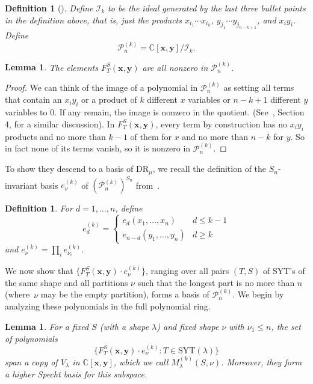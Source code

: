 \documentclass[11pt]{article}
\newtheorem{definition}[theo]{Definition}
\newtheorem{lemma}[theo]{Lemma}
\theoremstyle{definition}
\numberwithin{equation}{section}
\newcommand{\SYT}{\mathrm{SYT}}
\newcommand{\DR}{\mathrm{DR}}
\begin{document}
\begin{definition}[\cite{HookBases}]
	Define $\mathcal{I}_k$ to be the ideal generated by  the last three bullet points in the definition above, that is, just the products $x_{i_1}\cdots x_{i_k}$, $y_{j_1}\cdots y_{j_{n-k+1}}$, and $x_iy_i$.  Define $$\mathcal{P}_{n}^{(k)}=\mathbb{C}[\mathbf{x},\mathbf{y}]/\mathcal{I}_k.$$
\end{definition}

\begin{lemma}
	The elements $F_T^S(\mathbf{x},\mathbf{y})$ are all nonzero in $\mathcal{P}_n^{(k)}$.
\end{lemma}

\begin{proof}
	We can think of the image of a polynomial in $\mathcal{P}_n^{(k)}$ as setting all terms that contain an $x_iy_i$ or a product of $k$ different $x$ variables or $n-k+1$ different $y$ variables to $0$.  If any remain, the image is nonzero in the quotient. (See~\cite{HookBases}, Section 4, for a similar discussion).  In $F_T^S(\mathbf{x},\mathbf{y})$, every term by construction has no $x_iy_i$ products and no more than $k-1$ of them for $x$ and no more than $n-k$ for $y$.  So in fact none of its terms vanish, so it is nonzero in $\mathcal{P}_n^{(k)}$.
\end{proof}

To show they descend to a basis of $\DR_\mu$, we recall the definition of the $S_n$-invariant basis $e_\nu^{(k)}$ of $(\mathcal{P}_n^{(k)})^{S_n}$ from~\cite{HookBases}.

\begin{definition}
	For $d=1,\ldots,n$, define $$e_d^{(k)}=\begin{cases}
	e_d(x_1,\ldots,x_n) & d\le k-1 \\
	e_{n-d}(y_1,\ldots,y_n) & d\ge k
	\end{cases}$$ and $e_\nu^{(k)}=\prod_i e_{\nu_i}^{(k)}$.
\end{definition}

We now show that $\{F_T^S(\mathbf{x},\mathbf{y})\cdot e_\nu^{(k)}\}$, ranging over all pairs $(T,S)$ of SYT's of the same shape and all partitions $\nu$ such that the longest part is no more than $n$ (where~$\nu$ may be the empty partition), forms a basis of $\mathcal{P}_n^{(k)}$.  We begin by analyzing these polynomials in the full polynomial ring.

\begin{lemma}\label{lem:MS}
	For a fixed $S$ (with a shape $\lambda$) and fixed shape $\nu$ with $\nu_1\le n$, the set of polynomials $$\{F_T^S(\mathbf{x},\mathbf{y})\cdot e_\nu^{(k)}:T\in \SYT(\lambda)\}$$ span a copy of $V_\lambda$ in $\mathbb{C}[\mathbf{x},\mathbf{y}]$, which we call $M^{(k)}_{\lambda}(S,\nu)$.  Moreover, they form a higher Specht basis for this subspace.
\end{lemma}
\end{document}
